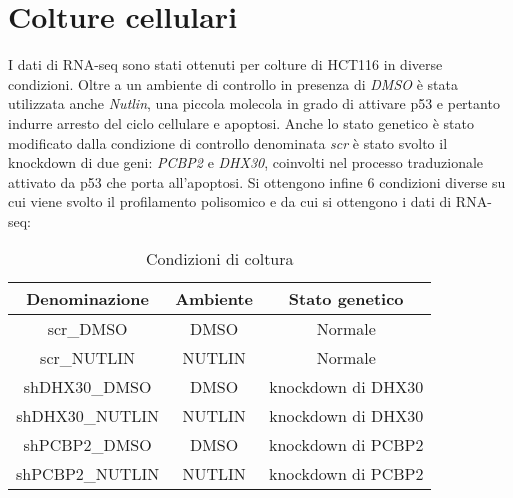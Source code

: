 \section{Colture cellulari}
I dati di RNA-seq sono stati ottenuti per colture di HCT116 in diverse condizioni.
Oltre a un ambiente di controllo in presenza di \emph{DMSO} \`e stata utilizzata anche \emph{Nutlin}, una piccola molecola in grado di attivare p53 e pertanto indurre arresto del ciclo cellulare e apoptosi.
Anche lo stato genetico \`e stato modificato dalla condizione di controllo denominata \emph{scr} \`e stato svolto il knockdown di due geni: \emph{PCBP2} e \emph{DHX30}, coinvolti nel processo traduzionale attivato da p53 che porta all'apoptosi.
Si ottengono infine $6$ condizioni diverse su cui viene svolto il profilamento polisomico e da cui si ottengono i dati di RNA-seq:
\begin{table}[H]
  \begin{tabular}{|c|c|c|}
    \hline
    Denominazione & Ambiente & Stato genetico\\
    \hline
    scr\_DMSO & DMSO & Normale\\
    \hline
    scr\_NUTLIN & NUTLIN & Normale\\
    \hline
    shDHX30\_DMSO & DMSO & knockdown di DHX30\\
    \hline
    shDHX30\_NUTLIN & NUTLIN & knockdown di DHX30\\
    \hline
    shPCBP2\_DMSO & DMSO & knockdown di PCBP2\\
    \hline
    shPCBP2\_NUTLIN & NUTLIN & knockdown di PCBP2\\
    \hline
  \end{tabular}
  \centering
  \caption{Condizioni di coltura}
  \label{tab:concolture}
\end{table}


